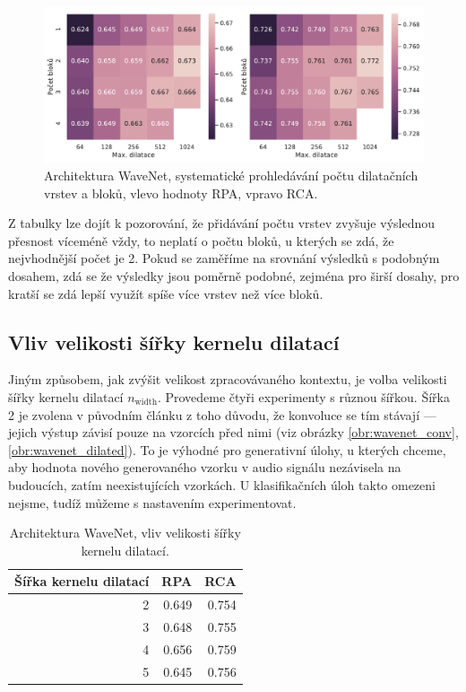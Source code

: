 \begin{figure}[h]\centering
    \includegraphics[scale=0.5]{../img/figures/wavenet_stacks_gridsearch.pdf}
\caption{Architektura WaveNet, systematické prohledávání počtu dilatačních vrstev a bloků, vlevo hodnoty RPA, vpravo RCA.}\label{obr:wavenet_stacks_gridsearch}
\end{figure}

Z tabulky lze dojít k pozorování, že přidávání počtu vrstev zvyšuje výslednou přesnost víceméně vždy, to neplatí o počtu bloků, u kterých se zdá, že nejvhodnější počet je 2. Pokud se zaměříme na srovnání výsledků s podobným dosahem, zdá se že výsledky jsou poměrně podobné, zejména pro širší dosahy, pro kratší se zdá lepší využít spíše více vrstev než více bloků.

\subsection{Vliv velikosti šířky kernelu dilatací}

Jiným způsobem, jak zvýšit velikost zpracovávaného kontextu, je volba velikosti šířky kernelu dilatací $n_{\mathrm{width}}$. Provedeme čtyři experimenty s různou šířkou. Šířka 2 je zvolena v původním článku z toho důvodu, že konvoluce se tím stávají  --- jejich výstup závisí pouze na vzorcích před nimi (viz obrázky \ref{obr:wavenet_conv}, \ref{obr:wavenet_dilated}). To je výhodné pro generativní úlohy, u kterých chceme, aby hodnota nového generovaného vzorku v audio signálu nezávisela na budoucích, zatím neexistujících vzorkách. U klasifikačních úloh takto omezeni nejsme, tudíž můžeme s nastavením experimentovat. 

\begin{table}[h!]
\centering
    \begin{tabular}{rrr}
    \toprule
    Šířka kernelu dilatací &   RPA &   RCA \\
    \midrule
                        2 & 0.649 & 0.754 \\
                        3 & 0.648 & 0.755 \\
                        4 & 0.656 & 0.759 \\
                        5 & 0.645 & 0.756 \\
    \bottomrule
    \end{tabular}
\caption{Architektura WaveNet, vliv velikosti šířky kernelu dilatací.}\label{tab:wavenet_dilation_width}
\end{table}

